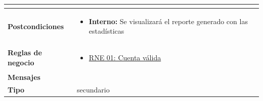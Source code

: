 \begin{center}
\begin{longtable}{| p{3.5cm} | p{11.5cm} |}
\begin{itemize}
              \end{itemize} \\
        \hline  
          \textbf{Postcondiciones} &
              \begin{itemize}
                \item \textbf{Interno:} Se visualizará el reporte generado con las estadísticas
                \end{itemize} \\
        \hline
          \textbf{Reglas de negocio} & 
              \begin{itemize}
                 \item {\hyperref[rnr_01]{RNE 01: Cuenta válida}}
              \end{itemize} \\
        \hline
          \textbf{Mensajes} & \\
        \hline
          \textbf{Tipo} & secundario\\
        \hline      
  \end{longtable}
\end{center}
\endgroup

